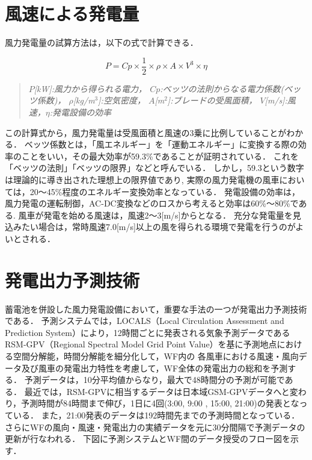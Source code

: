 \documentclass[a4paper,12pt,showkeys]{jreport}
\begin{document}
\section{風速による発電量}

風力発電量の試算方法は，以下の式で計算できる\cite{牛山}．

\[
  P = Cp \times \frac{1}{2} \times \rho \times A \times V^3 \times \eta 
\]

\begin{quotation}
\it$P$[kW]:風力から得られる電力，
\it$Cp$:ベッツの法則からなる電力係数(ベッツ係数)，
$\rho$[kg/m$^3$]:空気密度，
\it$A$[m$^2$]:ブレードの受風面積，
\it$V$[m/s]:風速，$\eta$:発電設備の効率
\end{quotation}

この計算式から，風力発電量は受風面積と風速の3乗に比例していることがわかる．
ベッツ係数とは，「風エネルギー」を「運動エネルギー」に変換する際の効率のことをいい，その最大効率が59.3\%であることが証明されている．
これを「ベッツの法則」「ベッツの限界」などと呼んでいる．
しかし，59.3という数字は理論的に導き出された理想上の限界値であり,
実際の風力発電機の風車においては，20～45\%程度のエネルギー変換効率となっている．
発電設備の効率は，風力発電の運転制御，AC-DC変換などのロスから考えると効率は60\%～80\%である.
風車が発電を始める風速は，風速2～3[m/s]からとなる．
充分な発電量を見込みたい場合は，常時風速7.0[m/s]以上の風を得られる環境で発電を行うのがよいとされる．

\section{発電出力予測技術}

蓄電池を併設した風力発電設備において，重要な手法の一つが発電出力予測技術である．
予測システムでは，LOCALS（Local Circulation Assessment and Prediction System）により，12時間ごとに発表される気象予測データである
RSM-GPV（Regional Spectral Model Grid Point Value）を基に予測地点における空間分解能，時間分解能を細分化して，WF内の
各風車における風速・風向データ及び風車の発電出力特性を考慮して，WF全体の発電出力の総和を予測する．
予測データは，10分平均値からなり，最大で48時間分の予測が可能である．
最近では，RSM-GPVに相当するデータは日本域GSM-GPVデータへと変わり，予測時間が84時間まで伸び，1日に4回(3:00,  9:00
, 15:00, 21:00)の発表となっている．
また，21:00発表のデータは192時間先までの予測時間となっている．
さらにWFの風向・風速・発電出力の実績データを元に30分間隔で予測データの更新が行なわれる\cite{電力}．
下図に予測システムとWF間のデータ授受のフロー図を示す．
\end{document}
